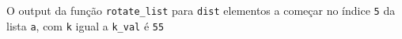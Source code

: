 \documentclass[12pt,varwidth=16cm,border=1pt]{standalone}
\begin{document}
O output da função \verb+rotate_list+ para \verb+dist+ elementos a começar no índice \verb+5+ da lista \verb+a+, com \verb+k+ igual a \verb+k_val+ é \verb+55+ 

\questiomtrue
\end{document}
